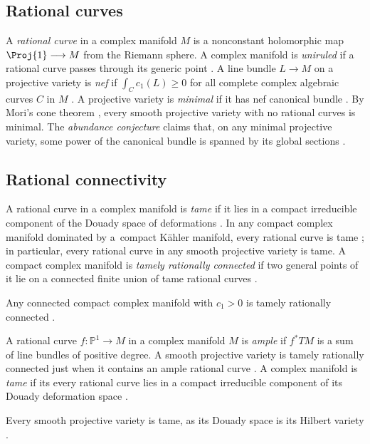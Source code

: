 \subsection{Rational curves}\label{subsection:rational.curves}
A \emph{rational curve} in a complex manifold $M$ is a nonconstant holomorphic map $\Proj{1}\longrightarrow M$ from the Riemann sphere.
A complex manifold is \emph{uniruled} if a rational curve passes through its generic point \cite[p.~181]{Kollar:1996}.
A line bundle $L \to M$ on a projective variety is \emph{nef} if $\int_C c_1(L) \ge 0$ for all complete complex algebraic curves $C$ in $M$ \cite[Definition~1.4.1]{Lazarsfeld:2004}.
A projective variety is \emph{minimal} if it has nef canonical bundle \cite[p. 2]{Cascini:2013}.
By Mori's cone theorem \cite{Cascini:2013,Mori:1982}, every smooth projective variety with no rational curves is minimal.
The \emph{abundance conjecture} claims that, on any minimal projective variety, some power of the canonical bundle is spanned by its global sections \cite{Siu:2009}.

\subsection{Rational connectivity}
A rational curve in a complex manifold is \emph{tame} if it lies in a compact irreducible component of the Douady space of deformations \cite{Douady:1966}.
In any compact complex manifold dominated by a~compact K\"ahler manifold, every rational curve is tame \cite{MR715653,MR973802}; in particular, every rational curve in any smooth projective variety is tame.
A compact complex manifold is \emph{tamely rationally connected} if two general points of it lie on a connected finite union of tame rational curves \cite{Kollar:1996}.
\begin{Example}
Any connected compact complex manifold with $c_1 > 0$ is tamely rationally connected \cite{Campana:1992}.
\end{Example}
A rational curve $f \colon \mathbb{P}^1\longrightarrow M$ in a complex manifold $M$ is \emph{ample} if $f^*TM$ is a sum of line bundles of positive degree.
A smooth projective variety is tamely rationally connected just when it contains an ample rational curve \cite[Definition 1.1, Theorems 1.9,~3.7 and~3.10]{Kollar:1996}.
A complex manifold is \emph{tame} if its every rational curve lies in a compact irreducible component of its Douady deformation space \cite[p.~2]{Biswas.McKay:2016}.

Every smooth projective variety is tame, as its Douady space is its Hilbert variety \cite{Douady:1966}.
